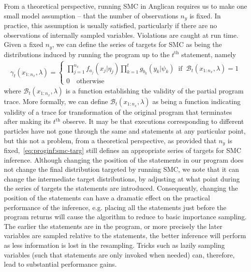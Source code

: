 From a theoretical perspective, running SMC in Anglican
requires us to make one small model assumption -- that the number of observations $n_y$ is fixed.  In
practice, this assumption is usually satisfied, particularly if there are no observations of
internally sampled variables.  Violations are caught at run time.  Given
a fixed $n_y$, we can define the series of targets for SMC as being the distributions
induced by running the program up to the $t^{\text{th}}$ \observe statement, namely
\begin{align}
\label{eq:proginf:smc-targ}
\gamma_t(x_{1:n_x}, \lambda) = \begin{cases}
\prod_{j=1}^{n_x} 
f_{a_j}(x_j | \eta_j)
\prod_{k=1}^{t}
g_{b_k}(y_k | \psi_k) \;\; \text{if} \;\; \mathcal{B}_t(x_{1:n_x},\lambda)=1 \\
0 \quad \text{otherwise}
\end{cases}
\end{align}
where $\mathcal{B}_t(x_{1:n_x},\lambda)$ is a function establishing the validity of the 
partial program trace.  More formally, we can define $\mathcal{B}_t(x_{1:n_x},\lambda)$ as
being a function indicating validity of a trace for transformation of the original program
that terminates after making its $t^{\text{th}}$ observe.
It may be that executions corresponding to different particles have not gone through the 
same \sample and \observe statements at any particular point, but this not a problem, from a theoretical perspective,
as provided that $n_y$ is fixed,~\eqref{eq:proginf:smc-targ} still defines an appropriate
series of targets for SMC inference.
Although changing the position of the \observe statements in
our program does not change the final distribution targeted by running SMC, we note that it can change
the intermediate target distributions, by adjusting at what point during the series of targets
the \sample statements are introduced.  Consequently, changing the position of the \observe
statements can have a dramatic effect on the practical performance of the inference, e.g.
placing all the \observe statements just before the program returns will cause the algorithm
to reduce to basic importance sampling.  The earlier the \observe statements are in the program,
or more precisely the later variables are sampled relative to the \observe statements, the
better inference will perform as less information is lost in
the resampling.  Tricks such as lazily sampling variables (such that \sample statements
are only invoked when needed) can, therefore, lead to substantial
performance gains.


